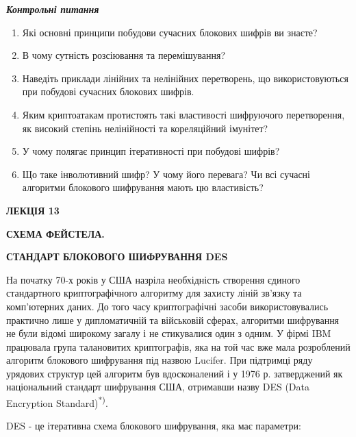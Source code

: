 \bigskip

{\centering\bfseries\itshape
Контрольні питання
\par}


\bigskip


\bigskip

\liststyleWWviiiNumxlviii
\begin{enumerate}
\item Які основні принципи побудови сучасних блокових шифрів ви знаєте?
\item В чому сутність розсіювання та перемішування?
\item Наведіть приклади лінійних та нелінійних перетворень, що використовуються
при побудові сучасних блокових шифрів.
\item Яким криптоатакам протистоять такі властивості шифруючого перетворення, як
високий степінь нелінійності та кореляційний імунітет?
\item У чому полягає принцип ітеративності при побудові шифрів?
\item Що таке інволютивний шифр? У чому його перевага? Чи всі сучасні алгоритми
блокового шифрування мають цю властивість?
\end{enumerate}

\bigskip


\bigskip

{\bfseries
ЛЕКЦІЯ  13}


\bigskip

{\centering\bfseries
СХЕМА  ФЕЙСТЕЛА. 
\par}

{\centering\bfseries
СТАНДАРТ  БЛОКОВОГО  ШИФРУВАННЯ  DES
\par}


\bigskip


\bigskip

На початку 70-х років у США назріла необхідність створення єдиного стандартного
криптографічного алгоритму для захисту ліній зв’язку та комп’ютерних даних. До
того часу криптографічні засоби використовувались практично лише у
дипломатичній та військовій сферах, алгоритми шифрування не були відомі
широкому загалу і не стикувалися один з одним. У фірмі IBM працювала група
талановитих криптографів, яка на той час вже мала розроблений алгоритм
блокового шифрування під назвою Lucifer. При підтримці ряду урядових структур
цей алгоритм був вдосконалений і у 1976 р.  затверджений як  національний
стандарт шифрування США, отримавши назву DES (Data Encryption
Standard)\textsuperscript{*)}. 

DES -  це ітеративна схема блокового шифрування, яка має параметри:

